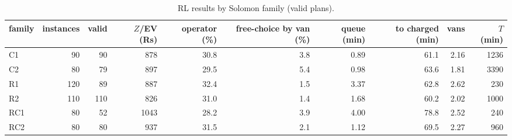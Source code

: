 \begin{table}[H]\centering
\small
\caption{RL results by Solomon family (valid plans).}\label{tab:family}
\begin{adjustbox}{max width=\textwidth}\begin{tabular}{lrrrrrrrrr}\toprule
family & instances & valid & $Z$/EV (Rs) & operator (\%) & free-choice by van (\%) & queue (min) & to charged (min) & vans & $T$ (min) \\ \midrule
C1 & 90 & 90 & 878 & 30.8 & 3.8 & 0.89 & 61.1 & 2.16 & 1236 \\
C2 & 80 & 79 & 897 & 29.5 & 5.4 & 0.98 & 63.6 & 1.81 & 3390 \\
R1 & 120 & 89 & 887 & 32.4 & 1.5 & 3.37 & 62.8 & 2.62 & 230 \\
R2 & 110 & 110 & 826 & 31.0 & 1.4 & 1.68 & 60.2 & 2.02 & 1000 \\
RC1 & 80 & 52 & 1043 & 28.2 & 3.9 & 4.00 & 78.8 & 2.52 & 240 \\
RC2 & 80 & 80 & 937 & 31.5 & 2.1 & 1.12 & 69.5 & 2.27 & 960 \\
\bottomrule\end{tabular}\end{adjustbox}\end{table}
